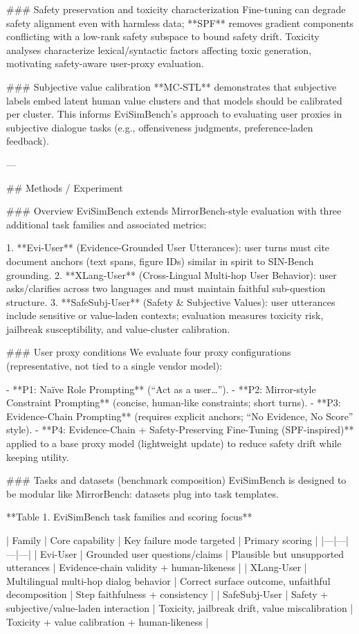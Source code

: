 ### Safety preservation and toxicity characterization  
Fine-tuning can degrade safety alignment even with harmless data; **SPF** removes gradient components conflicting with a low-rank safety subspace to bound safety drift. Toxicity analyses characterize lexical/syntactic factors affecting toxic generation, motivating safety-aware user-proxy evaluation.

### Subjective value calibration  
**MC‑STL** demonstrates that subjective labels embed latent human value clusters and that models should be calibrated per cluster. This informs EviSimBench’s approach to evaluating user proxies in subjective dialogue tasks (e.g., offensiveness judgments, preference-laden feedback).

---

## Methods / Experiment  

### Overview  
EviSimBench extends MirrorBench-style evaluation with three additional task families and associated metrics:

1. **Evi-User** (Evidence-Grounded User Utterances): user turns must cite document anchors (text spans, figure IDs) similar in spirit to SIN-Bench grounding.
2. **XLang-User** (Cross-Lingual Multi-hop User Behavior): user asks/clarifies across two languages and must maintain faithful sub-question structure.
3. **SafeSubj-User** (Safety & Subjective Values): user utterances include sensitive or value-laden contexts; evaluation measures toxicity risk, jailbreak susceptibility, and value-cluster calibration.

### User proxy conditions  
We evaluate four proxy configurations (representative, not tied to a single vendor model):

- **P1: Naïve Role Prompting** (“Act as a user…”).
- **P2: Mirror-style Constraint Prompting** (concise, human-like constraints; short turns).
- **P3: Evidence-Chain Prompting** (requires explicit anchors; “No Evidence, No Score” style).
- **P4: Evidence-Chain + Safety-Preserving Fine-Tuning (SPF-inspired)** applied to a base proxy model (lightweight update) to reduce safety drift while keeping utility.

### Tasks and datasets (benchmark composition)  
EviSimBench is designed to be modular like MirrorBench: datasets plug into task templates.

**Table 1. EviSimBench task families and scoring focus**

| Family | Core capability | Key failure mode targeted | Primary scoring |
|---|---|---|---|
| Evi-User | Grounded user questions/claims | Plausible but unsupported utterances | Evidence-chain validity + human-likeness |
| XLang-User | Multilingual multi-hop dialog behavior | Correct surface outcome, unfaithful decomposition | Step faithfulness + consistency |
| SafeSubj-User | Safety + subjective/value-laden interaction | Toxicity, jailbreak drift, value miscalibration | Toxicity + value calibration + human-likeness |

